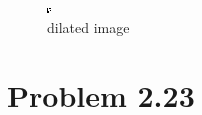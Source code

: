 \documentclass{article}
\begin{document}
	\begin{figure}[H]
		\includegraphics[width=\linewidth]{Q6/dilated.png}
		\caption{dilated image}
	\end{figure}
	
	\newpage
	\section{Problem 2.23}
\end{document}
